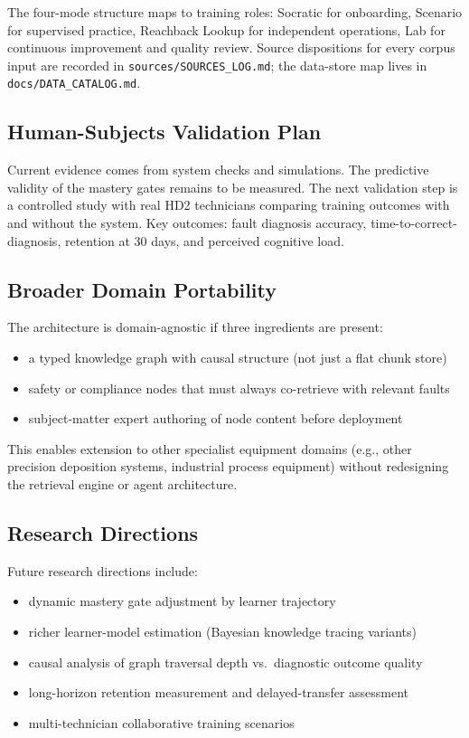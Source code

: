 \documentclass[10pt,letterpaper,twocolumn]{article}
\newcommand{\code}[1]{\texttt{\small #1}}
\begin{document}
The four-mode structure maps to training roles: Socratic for onboarding, Scenario for supervised practice, Reachback Lookup for independent operations, Lab for continuous improvement and quality review. Source dispositions for every corpus input are recorded in \code{sources/SOURCES\_LOG.md}; the data-store map lives in \code{docs/DATA\_CATALOG.md}.

\subsection{Human-Subjects Validation Plan}
Current evidence comes from system checks and simulations. The predictive validity of the mastery gates remains to be measured. The next validation step is a controlled study with real HD2 technicians comparing training outcomes with and without the system. Key outcomes: fault diagnosis accuracy, time-to-correct-diagnosis, retention at 30 days, and perceived cognitive load.

\subsection{Broader Domain Portability}
The architecture is domain-agnostic if three ingredients are present:
\begin{itemize}
  \item a typed knowledge graph with causal structure (not just a flat chunk store)
  \item safety or compliance nodes that must always co-retrieve with relevant faults
  \item subject-matter expert authoring of node content before deployment
\end{itemize}

This enables extension to other specialist equipment domains (e.g., other precision deposition systems, industrial process equipment) without redesigning the retrieval engine or agent architecture.

\subsection{Research Directions}
Future research directions include:
\begin{itemize}
  \item dynamic mastery gate adjustment by learner trajectory
  \item richer learner-model estimation (Bayesian knowledge tracing variants)
  \item causal analysis of graph traversal depth vs.\ diagnostic outcome quality
  \item long-horizon retention measurement and delayed-transfer assessment
  \item multi-technician collaborative training scenarios
\end{itemize}
\end{document}
